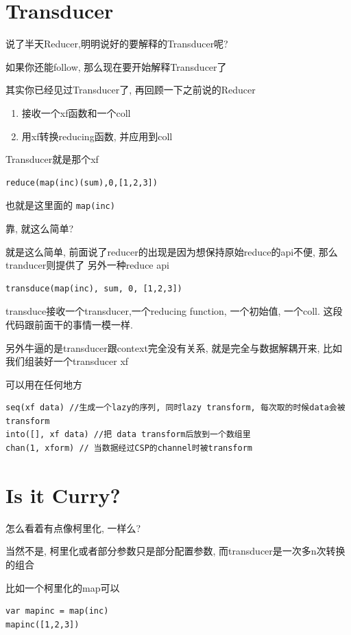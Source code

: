 \documentclass[a5paper]{book}
\begin{document}
\chapter{Transducer}
\label{sec:orgheadline28}
说了半天Reducer,明明说好的要解释的Transducer呢?

如果你还能follow, 那么现在要开始解释Transducer了

其实你已经见过Transducer了, 再回顾一下之前说的Reducer
\begin{enumerate}
\item 接收一个xf函数和一个coll
\item 用xf转换reducing函数, 并应用到coll
\end{enumerate}

Transducer就是那个xf
\begin{verbatim}
reduce(map(inc)(sum),0,[1,2,3])
\end{verbatim}
也就是这里面的 \texttt{map(inc)}

靠, 就这么简单?

就是这么简单, 前面说了reducer的出现是因为想保持原始reduce的api不便, 那么tranducer则提供了
另外一种reduce api

\begin{verbatim}
transduce(map(inc), sum, 0, [1,2,3])
\end{verbatim}
transduce接收一个transducer,一个reducing function, 一个初始值, 一个coll. 这段代码跟前面干的事情一模一样.

另外牛逼的是transducer跟context完全没有关系, 就是完全与数据解耦开来, 比如我们组装好一个transducer xf

可以用在任何地方
\begin{verbatim}
seq(xf data) //生成一个lazy的序列, 同时lazy transform, 每次取的时候data会被transform
into([], xf data) //把 data transform后放到一个数组里
chan(1, xform) // 当数据经过CSP的channel时被transform
\end{verbatim}


\chapter{Is it Curry?}
\label{sec:orgheadline29}
怎么看着有点像柯里化, 一样么?

当然不是, 柯里化或者部分参数只是部分配置参数, 而transducer是一次多n次转换的组合

比如一个柯里化的map可以
\begin{verbatim}
var mapinc = map(inc)
mapinc([1,2,3])
\end{verbatim}
\end{document}
